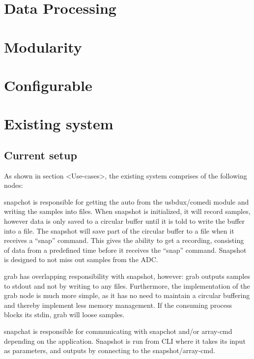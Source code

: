 \section{Data Processing}
% 


\section{Modularity}
% 

\section{Configurable}





\section{Existing system}

\subsection{Current setup}

As shown in section <Use-cases>, the existing system comprises of the following nodes:

snapchot is responsible for getting the auto from the usbdux/comedi module and writing the samples into files. When snapshot is initialized, it will record samples, however data is only saved to a circular buffer until it is told to write the buffer into a file. The snapshot will save part of the circular buffer to a file when it receives a “snap” command. This gives the ability to get a recording, consisting of data from a predefined time before it receives the “snap” command. Snapshot is designed to not miss out samples from the ADC.

grab has overlapping responsibility with snapshot, however: grab outputs samples to stdout and not by writing to any files. Furthermore, the implementation of the grab node is much more simple, as it has no need to maintain a circular buffering and thereby implement less memory management. If the consuming process blocks its stdin, grab will loose samples.

snapchat is responsible for communicating with snapchot and/or array-cmd depending on the application. Snapshot is run from CLI where it takes its input as parameters, and outputs by connecting to the snapshot/array-cmd.

